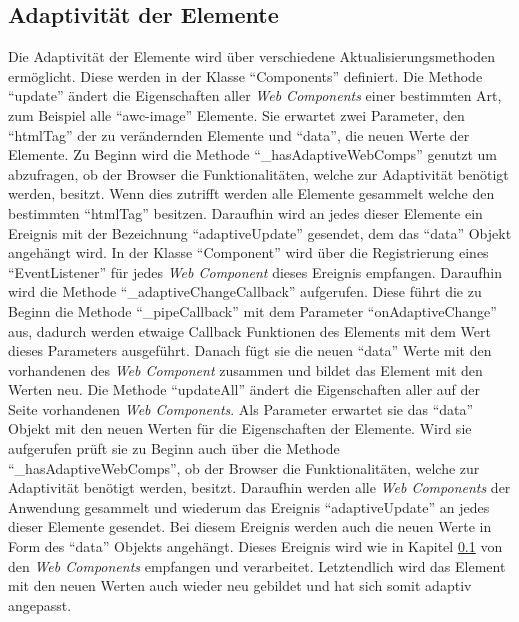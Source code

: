 \documentclass[12pt, paper=a4, bibtotoc, toc=listof, headsepline=true]{scrreprt}
\begin{document}
	\subsection{Adaptivität der Elemente}
	\label{sec:adaDerEle}
	Die Adaptivität der Elemente wird über verschiedene Aktualisierungsmethoden ermöglicht. Diese werden in der Klasse \enquote{Components} definiert. Die Methode \enquote{update} ändert die Eigenschaften aller \emph{Web Components} einer bestimmten Art, zum Beispiel alle \enquote{awc-image} Elemente. Sie erwartet zwei Parameter, den \enquote{htmlTag} der zu verändernden Elemente und \enquote{data}, die neuen Werte der Elemente. Zu Beginn wird die Methode \enquote{\_hasAdaptiveWebComps} genutzt um abzufragen, ob der Browser die Funktionalitäten, welche zur Adaptivität benötigt werden, besitzt. Wenn dies zutrifft werden alle Elemente gesammelt welche den bestimmten \enquote{htmlTag} besitzen. Daraufhin wird an jedes dieser Elemente ein Ereignis mit der Bezeichnung \enquote{adaptiveUpdate} gesendet, dem das \enquote{data} Objekt angehängt wird.
	In der Klasse \enquote{Component} wird über die Registrierung eines \enquote{EventListener} für jedes \emph{Web Component} dieses Ereignis empfangen. Daraufhin wird die Methode \enquote{\_adaptiveChangeCallback} aufgerufen. Diese führt die zu Beginn die Methode \enquote{\_pipeCallback} mit dem Parameter \enquote{onAdaptiveChange} aus, dadurch werden etwaige Callback Funktionen des Elements mit dem Wert dieses Parameters ausgeführt. Danach fügt sie die neuen \enquote{data} Werte mit den vorhandenen des \emph{Web Component} zusammen und bildet das Element mit den Werten neu.
	\newline
	Die Methode \enquote{updateAll} ändert die Eigenschaften aller auf der Seite vorhandenen \emph{Web Components}. Als Parameter erwartet sie das \enquote{data} Objekt mit den neuen Werten für die Eigenschaften der Elemente. Wird sie aufgerufen prüft sie zu Beginn auch über die Methode \enquote{\_hasAdaptiveWebComps}, ob der Browser die Funktionalitäten, welche zur Adaptivität benötigt werden, besitzt. Daraufhin werden alle \emph{Web Components} der Anwendung gesammelt und wiederum das Ereignis \enquote{adaptiveUpdate} an jedes dieser Elemente gesendet. Bei diesem Ereignis werden auch die neuen Werte in Form des \enquote{data} Objekts angehängt. Dieses Ereignis wird wie in Kapitel \ref{sec:adaDerEle} von den \emph{Web Components} empfangen und verarbeitet. Letztendlich wird das Element mit den neuen Werten auch wieder neu gebildet und hat sich somit adaptiv angepasst.
	\newline
\end{document}
